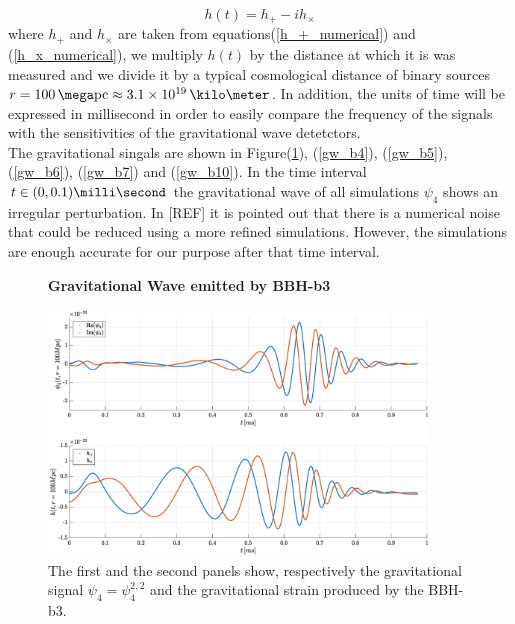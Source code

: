 \begin{equation}
\label{gravitational_wave_strain}
h(t) = h_{+} - i h_{\times}
\end{equation} 
where $h_{+}$ and $h_{\times}$ are taken from equations(\ref{h_+_numerical}) and (\ref{h_x_numerical}), we multiply $h(t)$ by the distance at which it is was measured and we divide it by a typical cosmological distance of binary sources $r=100 \, \mega \text{pc} \approx 3.1 \times 10^{19} \, \kilo \meter$.
In addition, the units of time will be expressed in millisecond in order to easily compare the frequency of the signals with the sensitivities of the gravitational wave detetctors.\\
The gravitational singals are shown in Figure(\ref{gw_b3}), (\ref{gw_b4}), (\ref{gw_b5}), (\ref{gw_b6}), (\ref{gw_b7}) and (\ref{gw_b10}).
In the time interval $t \in (0,0.1)\milli \second$ the gravitational wave of all simulations $\psi_4$ shows an irregular perturbation. 
In [REF] it is pointed out that there is a numerical noise that could be reduced using a more refined simulations. However,   the simulations are enough accurate for our purpose after that time interval.\\ 
\begin{figure}[H]
\centering
    \textbf{Gravitational Wave emitted by BBH-b3}\par\medskip
\centering
\includegraphics[width=0.9\textwidth]{numerical_evolution/gw_b3.eps}
\caption{The first and the second panels show, respectively the gravitational signal $\psi_4=\psi_4 ^{2,2}$ and the gravitational strain produced by the BBH-b3.}
   \label{gw_b3}
 \end{figure}

